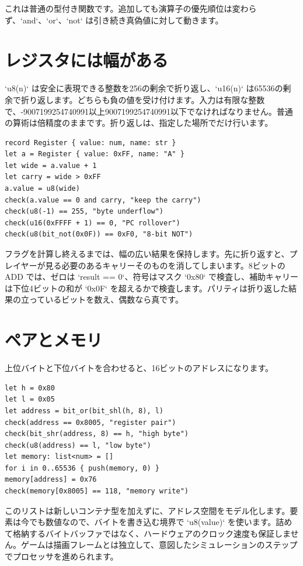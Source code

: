 これは普通の型付き関数です。追加しても演算子の優先順位は変わらず、`and`、`or`、`not` は引き続き真偽値に対して動きます。

\section{レジスタには幅がある}

`u8(n)` は安全に表現できる整数を256の剰余で折り返し、`u16(n)` は65536の剰余で折り返します。どちらも負の値を受け付けます。入力は有限な整数で、-9007199254740991以上9007199254740991以下でなければなりません。普通の算術は倍精度のままです。折り返しは、指定した場所でだけ行います。

\begin{lstlisting}[language=wick]
record Register { value: num, name: str }
let a = Register { value: 0xFF, name: "A" }
let wide = a.value + 1
let carry = wide > 0xFF
a.value = u8(wide)
check(a.value == 0 and carry, "keep the carry")
check(u8(-1) == 255, "byte underflow")
check(u16(0xFFFF + 1) == 0, "PC rollover")
check(u8(bit_not(0x0F)) == 0xF0, "8-bit NOT")
\end{lstlisting}

フラグを計算し終えるまでは、幅の広い結果を保持します。先に折り返すと、プレイヤーが見る必要のあるキャリーそのものを消してしまいます。8ビットの ADD では、ゼロは `result == 0`、符号はマスク `0x80` で検査し、補助キャリーは下位4ビットの和が `0x0F` を超えるかで検査します。パリティは折り返した結果の立っているビットを数え、偶数なら真です。

\section{ペアとメモリ}

上位バイトと下位バイトを合わせると、16ビットのアドレスになります。

\begin{lstlisting}[language=wick]
let h = 0x80
let l = 0x05
let address = bit_or(bit_shl(h, 8), l)
check(address == 0x8005, "register pair")
check(bit_shr(address, 8) == h, "high byte")
check(u8(address) == l, "low byte")
let memory: list<num> = []
for i in 0..65536 { push(memory, 0) }
memory[address] = 0x76
check(memory[0x8005] == 118, "memory write")
\end{lstlisting}

このリストは新しいコンテナ型を加えずに、アドレス空間をモデル化します。要素は今でも数値なので、バイトを書き込む境界で `u8(value)` を使います。詰めて格納するバイトバッファではなく、ハードウェアのクロック速度も保証しません。ゲームは描画フレームとは独立して、意図したシミュレーションのステップでプロセッサを進められます。


